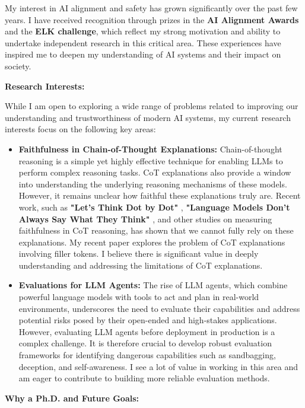 \documentclass[12pt]{article}
\begin{document}
My interest in AI alignment and safety has grown significantly over the past few years. I have received recognition through prizes in the \textbf{AI Alignment Awards} \cite{alignment_awards} and the \textbf{ELK challenge}, which reflect my strong motivation and ability to undertake independent research in this critical area. These experiences have inspired me to deepen my understanding of AI systems and their impact on society.

\textbf{Research Interests:}

While I am open to exploring a wide range of problems related to improving our understanding and trustworthiness of modern AI systems, my current research interests focus on the following key areas:

\begin{itemize}
    \item \textbf{Faithfulness in Chain-of-Thought Explanations:}  
    Chain-of-thought reasoning is a simple yet highly effective technique for enabling LLMs to perform complex reasoning tasks. CoT explanations also provide a window into understanding the underlying reasoning mechanisms of these models. However, it remains unclear how faithful these explanations truly are. Recent work, such as \textbf{"Let’s Think Dot by Dot"} \cite{pfau2024}, \textbf{"Language Models Don't Always Say What They Think"} \cite{turpin2023}, and other studies on measuring faithfulness in CoT reasoning, has shown that we cannot fully rely on these explanations. My recent paper explores the problem of CoT explanations involving filler tokens. I believe there is significant value in deeply understanding and addressing the limitations of CoT explanations.
    \newpage
    \item \textbf{Evaluations for LLM Agents:}  
    The rise of LLM agents, which combine powerful language models with tools to act and plan in real-world environments, underscores the need to evaluate their capabilities and address potential risks posed by their open-ended and high-stakes applications. However, evaluating LLM agents before deployment in production is a complex challenge. It is therefore crucial to develop robust evaluation frameworks for identifying dangerous capabilities such as sandbagging, deception, and self-awareness. I see a lot of value in working in this area and am eager to contribute to building more reliable evaluation methods.
\end{itemize}

\textbf{Why a Ph.D. and Future Goals:}
\end{document}
